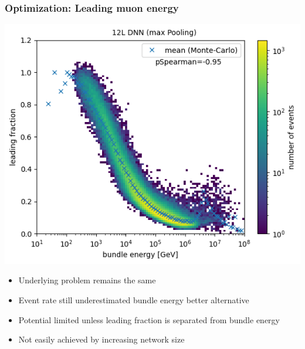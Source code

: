 \documentclass[aspectratio=1610, 9pt]{beamer}
\begin{document}
\begin{frame}
  \frametitle{Optimization: Leading muon energy}
  \includegraphics[scale=0.4]{Plots/Correlation bundle leading 12L}
  \begin{itemize}
    \item Underlying problem remains the same
    \item Event rate still underestimated \rightarrow bundle energy better alternative
    \item Potential limited unless leading fraction is separated from bundle energy
    \item Not easily achieved by increasing network size
  \end{itemize}
\end{frame}
\end{document}
